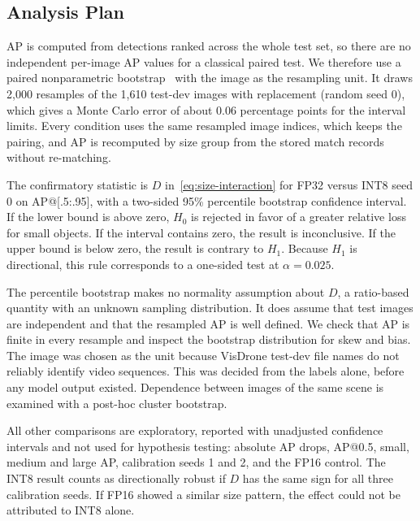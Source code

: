 \documentclass[conference]{IEEEtran}
\begin{document}
\subsection{Analysis Plan}
AP is computed from detections ranked across the whole test set, so there are no independent
per-image AP values for a classical paired test. We therefore use a paired nonparametric
bootstrap~\cite{efron1993bootstrap} with the image as the resampling unit. It draws 2,000
resamples of the 1,610 test-dev images with replacement (random seed 0), which gives a Monte
Carlo error of about 0.06 percentage points for the interval limits. Every condition uses the same resampled image indices, which keeps the
pairing, and AP is recomputed by size group from the stored match records without re-matching.

The confirmatory statistic is $D$ in~\eqref{eq:size-interaction} for FP32 versus INT8 seed 0 on
AP@[.5:.95], with a two-sided 95\% percentile bootstrap confidence interval. If the lower bound is
above zero, $H_0$ is rejected in favor of a greater relative loss for small objects. If the
interval contains zero, the result is inconclusive. If the upper bound is below zero, the result
is contrary to $H_1$. Because $H_1$ is directional, this rule corresponds to a one-sided test at
$\alpha=0.025$.

The percentile bootstrap makes no normality assumption about $D$, a ratio-based quantity with an
unknown sampling distribution. It does assume that test images are independent and that the
resampled AP is well defined. We check that AP is finite in every resample and inspect the
bootstrap distribution for skew and bias. The image was chosen as the unit because VisDrone
test-dev file names do not reliably identify video sequences. This was decided from the labels
alone, before any model output existed. Dependence between images of the same scene is examined
with a post-hoc cluster bootstrap.

All other comparisons are exploratory, reported with unadjusted confidence intervals and not used
for hypothesis testing:
absolute AP drops, AP@0.5, small, medium and large AP, calibration seeds 1 and 2, and the FP16
control. The INT8 result counts as directionally robust if $D$ has the same sign for all three
calibration seeds. If FP16 showed a similar size pattern, the effect could not be attributed to
INT8 alone.
\end{document}
